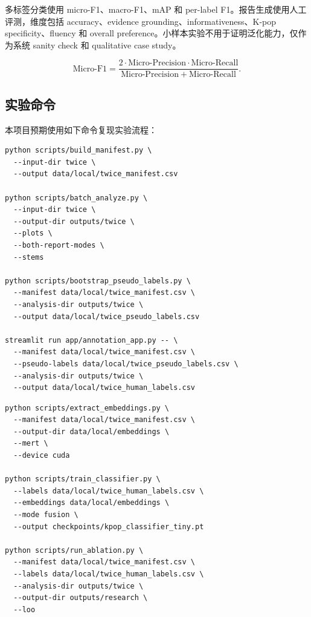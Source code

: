 \documentclass[UTF8,zihao=-4]{ctexart}
\begin{document}
多标签分类使用 micro-F1、macro-F1、mAP 和 per-label F1。报告生成使用人工评测，维度包括 accuracy、evidence grounding、informativeness、K-pop specificity、fluency 和 overall preference。小样本实验不用于证明泛化能力，仅作为系统 sanity check 和 qualitative case study。

\begin{equation}
\mathrm{Micro\text{-}F1}=\frac{2\cdot \mathrm{Micro\text{-}Precision}\cdot \mathrm{Micro\text{-}Recall}}{\mathrm{Micro\text{-}Precision}+\mathrm{Micro\text{-}Recall}}.
\end{equation}

\subsection{实验命令}

本项目预期使用如下命令复现实验流程：

\begin{lstlisting}[caption={本地 K-pop demo 分析流程}]
python scripts/build_manifest.py \
  --input-dir twice \
  --output data/local/twice_manifest.csv

python scripts/batch_analyze.py \
  --input-dir twice \
  --output-dir outputs/twice \
  --plots \
  --both-report-modes \
  --stems

python scripts/bootstrap_pseudo_labels.py \
  --manifest data/local/twice_manifest.csv \
  --analysis-dir outputs/twice \
  --output data/local/twice_pseudo_labels.csv

streamlit run app/annotation_app.py -- \
  --manifest data/local/twice_manifest.csv \
  --pseudo-labels data/local/twice_pseudo_labels.csv \
  --analysis-dir outputs/twice \
  --output data/local/twice_human_labels.csv
\end{lstlisting}

\begin{lstlisting}[caption={MERT embedding 与 tiny classifier 训练流程}]
python scripts/extract_embeddings.py \
  --manifest data/local/twice_manifest.csv \
  --output-dir data/local/embeddings \
  --mert \
  --device cuda

python scripts/train_classifier.py \
  --labels data/local/twice_human_labels.csv \
  --embeddings data/local/embeddings \
  --mode fusion \
  --output checkpoints/kpop_classifier_tiny.pt

python scripts/run_ablation.py \
  --manifest data/local/twice_manifest.csv \
  --labels data/local/twice_human_labels.csv \
  --analysis-dir outputs/twice \
  --output-dir outputs/research \
  --loo
\end{lstlisting}
\end{document}
